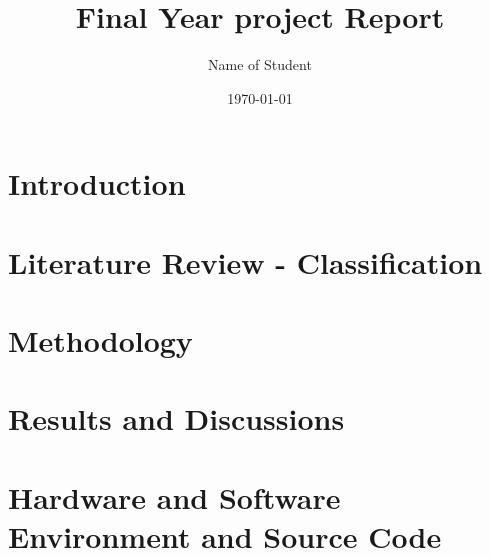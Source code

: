 \documentclass[a4paper,12pt]{report}
\title{Final Year project Report}
\author{Name of Student}
\date{\today}
\begin{document}
    
    
    \begin{onehalfspacing}
        
        
        
        \cleardoublepage
        
        \cleardoublepage
        \listoffigures
        \cleardoublepage
        \listoftables

        \tableofcontents



        
        \pagebreak
        
        \chapter{Introduction}
        
        \pagebreak

        \chapter{Literature Review - Classification}
        
        \pagebreak
        
        \chapter{Methodology}
        
        \pagebreak
        
        \chapter{Results and Discussions}
        
        \pagebreak

        \chapter{Hardware and Software
Environment and Source Code}
        
        \pagebreak


\end{onehalfspacing}
\end{document}
